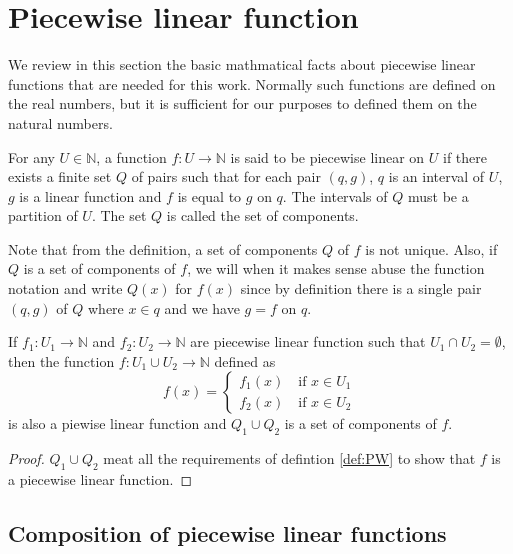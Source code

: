 
\section{Piecewise linear function}\label{sec:pwl}

We review in this section the basic mathmatical facts about piecewise linear
functions that are needed for this work. Normally such functions are defined on
the real numbers, but it is sufficient for our purposes to defined them on the natural
numbers.

\begin{definition}
  \label{def:PW}
  For any $U \in \mathbb{N}$, a function $f : U \rightarrow \mathbb{N}$ is said
  to be piecewise linear on $U$ if there exists a finite set $Q$ of pairs
  such that for each pair $(q,g)$, $q$ is an interval of $U$, $g$ is a linear
  function and $f$ is equal to $g$ on $q$. The intervals of $Q$ must be a
  partition of $U$. The set $Q$ is called the set of components.
\end{definition}
Note that from the definition, a set of components $Q$ of $f$ is not unique. Also, if
$Q$ is a set of components of $f$, we will when it makes sense abuse the
function notation and write $Q(x)$ for $f(x)$ since by definition there is a
single pair $(q, g)$ of $Q$ where $x \in q$ and we have $g = f$ on $q$. 

\begin{lemma}
  \label{thm:union_pwl}
  If $f_1 : U_1 \rightarrow \mathbb{N}$ and $f_2 : U_2 \rightarrow \mathbb{N}$
  are piecewise linear function such that $U_1 \cap U_2 = \emptyset$, then the
  function $f : U_1 \cup U_2 \rightarrow \mathbb{N}$ defined as
  \begin{equation*}
    f(x) = \begin{cases}
      f_1(x) \quad \text{if $x \in U_1$} \\
      f_2(x) \quad \text{if $x \in U_2$} 
    \end{cases}
  \end{equation*}
  is also a piewise linear function and $Q_1 \cup Q_2$ is a set of components of $f$.
\end{lemma}
\begin{proof}
  $Q_1 \cup Q_2$ meat all the requirements of defintion \ref{def:PW} to show
  that $f$ is a piecewise linear function.
\end{proof}

\subsection{Composition of piecewise linear functions}


